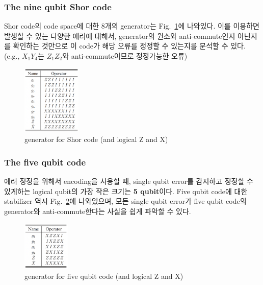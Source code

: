 \subsubsection{The nine qubit Shor code}
Shor code의 code space에 대한 8개의 generator는 Fig.~\ref{fig:shor_generator}에 나와있다. 이를 이용하면 발생할 수 있는 다양한 에러에 대해서, generator의 원소와 anti-commute인지 아닌지를 확인하는 것만으로 이 code가 해당 오류를 정정할 수 있는지를 분석할 수 있다. (e.g., $X_1Y_4$는 $Z_1Z_2$와 anti-commute이므로 정정가능한 오류)
\begin{figure}[h]
    \centering
    \includegraphics[width=0.25\textwidth]{figures/C7_stabilizer_shor_code.png}
    \caption{generator for Shor code (and logical Z and X)}
    \label{fig:shor_generator}
\end{figure}

\subsubsection{The five qubit code}
에러 정정을 위해서 encoding을 사용할 때, single qubit error를 감지하고 정정할 수 있게하는 logical qubit의 가장 작은 크기는 \textbf{5 qubit}이다. Five qubit code에 대한 stabilizer 역시 Fig.~\ref{fig:five_generator}에 나와있으며, 모든 single qubit error가 five qubit code의 generator와 anti-commute한다는 사실을 쉽게 파악할 수 있다. 
\begin{figure}[h]
    \centering
    \includegraphics[width=0.2\textwidth]{figures/C7_stabilizer_five_qubit.png}
    \caption{generator for five qubit code (and logical Z and X)}
    \label{fig:five_generator}
\end{figure}


